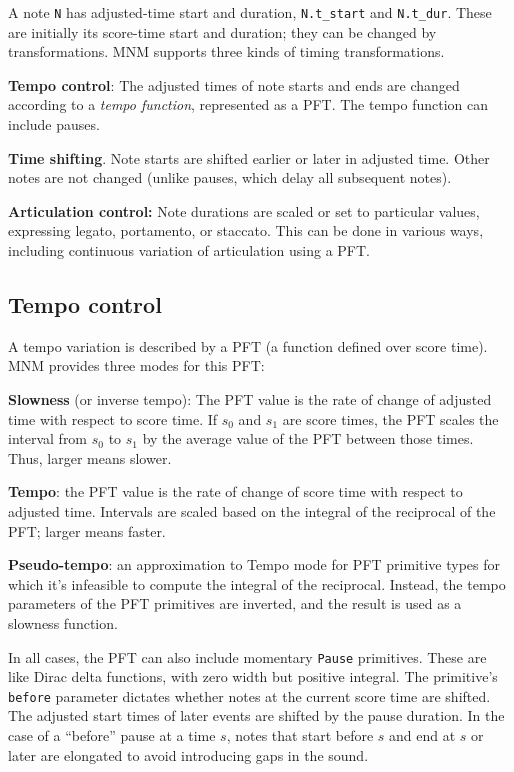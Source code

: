 \documentclass[letterpaper, 12pt]{article}
\begin{document}
A note \texttt{N} has adjusted-time start and duration,
\texttt{N.t\_start} and \texttt{N.t\_dur}.
These are initially its score-time start and duration;
they can be changed by transformations.
MNM supports three kinds of timing transformations.

\textbf{Tempo control}: The adjusted times of note starts and ends
are changed according to a \textit{tempo function},
represented as a PFT.
The tempo function can include pauses.

\textbf{Time shifting}.
Note starts are shifted earlier or later in adjusted time.
Other notes are not changed
(unlike pauses, which delay all subsequent notes).

\textbf{Articulation control:} Note durations
are scaled or set to particular values,
expressing legato, portamento, or staccato.
This can be done in various ways,
including continuous variation of articulation using a PFT.

\subsection{Tempo control}

A tempo variation is described by a PFT
(a function defined over score time).
MNM provides three modes for this PFT:

\textbf{Slowness} (or inverse tempo):
The PFT value is the rate of change of adjusted time
with respect to score time.
If $ s_0 $ and $ s_1 $ are score times,
the PFT scales the interval from $ s_0 $ to $ s_1 $
by the average value of the PFT between those times.
Thus, larger means slower.

\textbf{Tempo}:
the PFT value is the rate of change of score time
with respect to adjusted time.
Intervals are scaled
based on the integral of the reciprocal of the PFT;
larger means faster.

\textbf{Pseudo-tempo}:
an approximation to Tempo mode for PFT primitive types for which
it's infeasible to compute the integral of the reciprocal.
Instead, the tempo parameters of the PFT primitives are inverted,
and the result is used as a slowness function.

In all cases, the PFT can also include momentary \texttt{Pause} primitives.
These are like Dirac delta functions, with zero width but positive integral.
The primitive's \texttt{before} parameter dictates whether
notes at the current score time are shifted.
The adjusted start times of later events are shifted by the pause duration.
In the case of a ``before'' pause at a time $ s $,
notes that start before $ s $ and end at $ s $ or later are elongated
to avoid introducing gaps in the sound.
\end{document}
